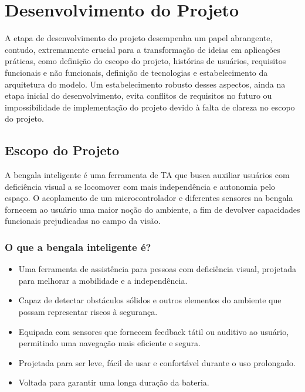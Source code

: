 \chapter{Desenvolvimento do Projeto}
\label{chap:resultados}

    A etapa de desenvolvimento do projeto desempenha um papel abrangente, contudo, extremamente crucial para a transformação de ideias em aplicações práticas, como definição do escopo do projeto, histórias de usuários, requisitos funcionais e não funcionais, definição de tecnologias e estabelecimento da arquitetura do modelo. Um estabelecimento robusto desses aspectos, ainda na etapa inicial do desenvolvimento, evita conflitos de requisitos no futuro ou impossibilidade de implementação do projeto devido à falta de clareza no escopo do projeto.   

\section{Escopo do Projeto}
\label{sec:resultados-do-experimento-a}

    A bengala inteligente é uma ferramenta de TA que busca auxiliar usuários com deficiência visual a se locomover com mais independência e autonomia pelo espaço. O acoplamento de um microcontrolador e diferentes sensores na bengala fornecem ao usuário uma maior noção do ambiente, a fim de devolver capacidades funcionais prejudicadas no campo da visão.

    \subsection{O que a bengala inteligente é?}
        \begin{itemize} 
            \item Uma ferramenta de assistência para pessoas com deficiência visual, projetada para melhorar a mobilidade e a independência.
            
            \item Capaz de detectar obstáculos sólidos e outros elementos do ambiente que possam representar riscos à segurança.
            
            \item Equipada com sensores que fornecem feedback tátil ou auditivo ao usuário, permitindo uma navegação mais eficiente e segura.
            
            \item Projetada para ser leve, fácil de usar e confortável durante o uso prolongado.
            
            \item Voltada para garantir uma longa duração da bateria.
        \end{itemize}

